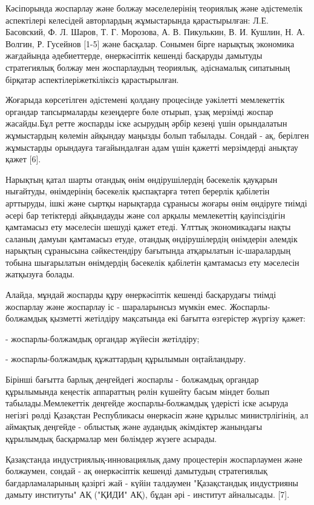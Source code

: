 \begin{multicols}{2}
Кәсіпорында жоспарлау және болжау мәселелерінің теориялық және
әдістемелік аспектілері келесідей авторлардың жұмыстарында
қарастырылған: Л.Е. Басовский, Ф. Л. Шаров, Т. Г. Морозова, А. В.
Пикулькин, В. И. Кушлин, Н. А. Волгин, Р. Гусейнов {[}1-5{]} және
басқалар. Сонымен бірге нарықтық экономика жағдайында әдебиеттерде,
өнеркәсіптік кешенді басқаруды дамытуды стратегиялық болжау мен
жоспарлаудың теориялық, әдіснамалық сипатының бірқатар
аспектілеріжеткіліксіз қарастырылған.

Жоғарыда көрсетілген әдістемені қолдану процесінде уәкілетті мемлекеттік
органдар тапсырмаларды кезеңдерге бөле отырып, ұзақ мерзімді жоспар
жасайды.Бұл ретте жоспарды іске асырудың әрбір кезеңі үшін орындалатын
жұмыстардың көлемін айқындау маңызды болып табылады. Сондай - ақ,
берілген жұмыстарды орындауға тағайындалған адам үшін қажетті
мерзімдерді анықтау қажет {[}6{]}.

Нарықтың қатал шарты отандық өнім өндірушілердің бәсекелік қауқарын
нығайтуды, өнімдерінің бәсекелік қыспақтарға төтеп берерлік қабілетін
арттыруды, ішкі және сыртқы нарықтарда сұранысы жоғары өнім өндіруге
тиімді әсері бар тетіктерді айқындауды және сол арқылы мемлекеттің
қауіпсіздігін қамтамасыз ету мәселесін шешуді қажет етеді. Ұлттық
экономикадағы нақты саланың дамуын қамтамасыз етуде, отандық
өндірушілердің өнімдерін әлемдік нарықтың сұранысына сәйкестендіру
бағытында атқарылатын іс-шаралардың тобына шығарылатын өнімдердің
бәсекелік қабілетін қамтамасыз ету мәселесін жатқызуға болады.

Алайда, мұндай жоспарды құру өнеркәсіптік кешенді басқарудағы тиімді
жоспарлау және жоспарлау іс - шараларынсыз мүмкін емес.
Жоспарлы-болжамдық қызметті жетілдіру мақсатында екі бағытта өзгерістер
жүргізу қажет:

- жоспарлы-болжамдық органдар жүйесін жетілдіру;

- жоспарлы-болжамдық құжаттардың құрылымын оңтайландыру.

Бірінші бағытта барлық деңгейдегі жоспарлы - болжамдық органдар
құрылымында кеңестік аппараттың рөлін күшейту басым міндет болып
табылады.Мемлекеттік деңгейде жоспарлы-болжамдық үдерісті іске асыруда
негізгі рөлді Қазақстан Республикасы өнеркәсіп және құрылыс
министрлігінің, ал аймақтық деңгейде - облыстық және аудандық әкімдіктер
жанындағы құрылымдық басқармалар мен бөлімдер жүзеге асырады.

Қазақстанда индустриялық-инновациялық даму процестерін жоспарлаумен және
болжаумен, сондай - ақ өнеркәсіптік кешенді дамытудың стратегиялық
бағдарламаларының қазіргі жай - күйін талдаумен "Қазақстандық
индустрияны дамыту институты" АҚ ("ҚИДИ" АҚ), бұдан әрі - институт
айналысады. {[}7{]}.


\end{multicols}
